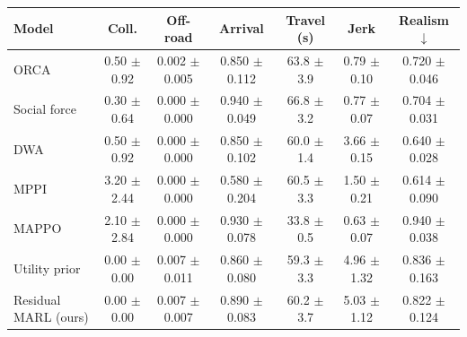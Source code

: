 \begin{tabular}{lcccccc}
\toprule
Model & Coll. & Off-road & Arrival & Travel (s) & Jerk & Realism $\downarrow$ \\
\midrule
ORCA & 0.50 $\pm$ 0.92 & 0.002 $\pm$ 0.005 & 0.850 $\pm$ 0.112 & 63.8 $\pm$ 3.9 & 0.79 $\pm$ 0.10 & 0.720 $\pm$ 0.046 \\
Social force & 0.30 $\pm$ 0.64 & 0.000 $\pm$ 0.000 & 0.940 $\pm$ 0.049 & 66.8 $\pm$ 3.2 & 0.77 $\pm$ 0.07 & 0.704 $\pm$ 0.031 \\
DWA & 0.50 $\pm$ 0.92 & 0.000 $\pm$ 0.000 & 0.850 $\pm$ 0.102 & 60.0 $\pm$ 1.4 & 3.66 $\pm$ 0.15 & 0.640 $\pm$ 0.028 \\
MPPI & 3.20 $\pm$ 2.44 & 0.000 $\pm$ 0.000 & 0.580 $\pm$ 0.204 & 60.5 $\pm$ 3.3 & 1.50 $\pm$ 0.21 & 0.614 $\pm$ 0.090 \\
MAPPO & 2.10 $\pm$ 2.84 & 0.000 $\pm$ 0.000 & 0.930 $\pm$ 0.078 & 33.8 $\pm$ 0.5 & 0.63 $\pm$ 0.07 & 0.940 $\pm$ 0.038 \\
Utility prior & 0.00 $\pm$ 0.00 & 0.007 $\pm$ 0.011 & 0.860 $\pm$ 0.080 & 59.3 $\pm$ 3.3 & 4.96 $\pm$ 1.32 & 0.836 $\pm$ 0.163 \\
Residual MARL (ours) & 0.00 $\pm$ 0.00 & 0.007 $\pm$ 0.007 & 0.890 $\pm$ 0.083 & 60.2 $\pm$ 3.7 & 5.03 $\pm$ 1.12 & 0.822 $\pm$ 0.124 \\
\bottomrule
\end{tabular}
